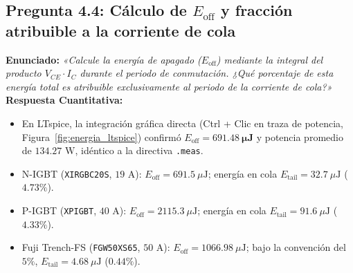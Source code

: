 \documentclass[11pt,a4paper]{article}
\begin{document}
\subsection{Pregunta 4.4: Cálculo de $E_{\text{off}}$ y fracción atribuible a la corriente de cola}
\textbf{Enunciado:} \textit{«Calcule la energía de apagado ($E_{\text{off}}$) mediante la integral del producto $V_{CE} \cdot I_C$ durante el periodo de conmutación. ¿Qué porcentaje de esta energía total es atribuible exclusivamente al periodo de la corriente de cola?»}\\
\textbf{Respuesta Cuantitativa:}
\begin{itemize}[leftmargin=*, noitemsep, topsep=2pt]
  \item En LTspice, la integración gráfica directa (Ctrl + Clic en traza de potencia, Figura~\ref{fig:energia_ltspice}) confirmó $E_{\text{off}} = \bm{691.48\ \mu\text{J}}$ y potencia promedio de $134.27\text{ W}$, idéntico a la directiva \texttt{.meas}.
  \item N-IGBT (\texttt{XIRGBC20S}, $19\text{ A}$): $E_{\text{off}} = 691.5\ \mu\text{J}$; energía en cola $E_{\text{tail}} = 32.7\ \mu\text{J}$ ($4.73\%$).
  \item P-IGBT (\texttt{XPIGBT}, $40\text{ A}$): $E_{\text{off}} = 2115.3\ \mu\text{J}$; energía en cola $E_{\text{tail}} = 91.6\ \mu\text{J}$ ($4.33\%$).
  \item Fuji Trench-FS (\texttt{FGW50XS65}, $50\text{ A}$): $E_{\text{off}} = 1066.98\ \mu\text{J}$; bajo la convención del $5\%$, $E_{\text{tail}} = 4.68\ \mu\text{J}$ ($0.44\%$).
\end{itemize}
\end{document}
